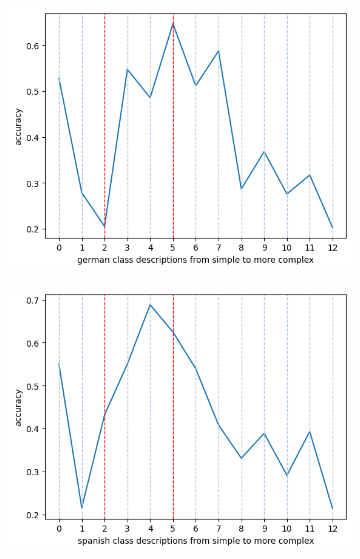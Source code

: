 \begin{figure}[ht]
    \centering

    \begin{subfigure}{0.31\textwidth}
        \includegraphics[width=\linewidth]{Images/germanacc.png}
    \end{subfigure}
    \hfill
    \begin{subfigure}{0.31\textwidth}
        \includegraphics[width=\linewidth]{Images/spanishacc.png}
    \end{subfigure}
    \hfill
    \begin{subfigure}{0.31\textwidth}

\end{subfigure}
\end{figure}
